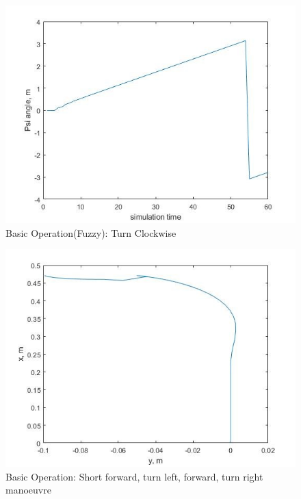 \documentclass{l4proj}
\begin{document}
\begin{figure}[htb]
    \centering
    \includegraphics[width=0.5\linewidth]{images/Basic3.jpg}

    \caption{Basic Operation(Fuzzy): Turn Clockwise
    }
    \label{fig:Model1sim3} 
\end{figure}
    \begin{figure}[htb]
    \centering
    \includegraphics[width=0.5\linewidth]{images/Basic4.jpg}

    \caption{Basic Operation: Short forward, turn left, forward, turn right manoeuvre}
    \label{fig:Model1sim4} 
\end{figure}
\end{document}
